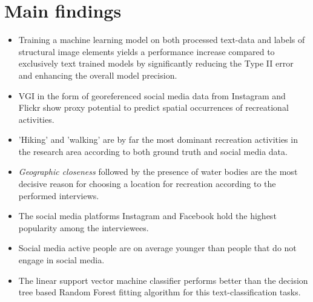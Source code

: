 \section{Main findings}

\begin{itemize}
  \item Training a machine learning model on both processed text-data and labels of structural image elements yields a performance increase compared to exclusively text trained models by significantly reducing the Type II error and enhancing the overall model precision.
  \item VGI in the form of georeferenced social media data from Instagram and Flickr show proxy potential to predict spatial occurrences of recreational activities.
  \item 'Hiking' and 'walking' are by far the most dominant recreation activities in the research area according to both ground truth and social media data.
  \item \textit{Geographic closeness} followed by the presence of water bodies are the most decisive reason for choosing a location for recreation according to the performed interviews.
  \item The social media platforms Instagram and Facebook hold the highest popularity among the interviewees.
  \item Social media active people are on average younger than people that do not engage in social media.
  \item The linear support vector machine classifier performs better than the decision tree based Random Forest fitting algorithm for this text-classification tasks. 
\end{itemize}

